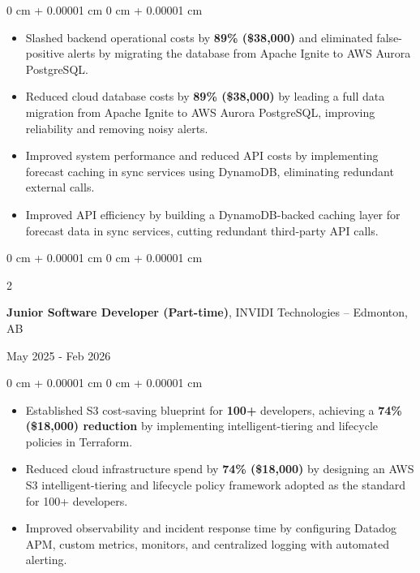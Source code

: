 \documentclass[10pt, letterpaper]{article}
\newenvironment{onecolentry}{
    \begin{adjustwidth}{
        0 cm + 0.00001 cm
    }{
        0 cm + 0.00001 cm
    }
}{
    \end{adjustwidth}
}
\newenvironment{twocolentry}[2][]{
    \onecolentry
    \def\secondColumn{#2}
    \setcolumnwidth{\fill, 6 cm}
    \begin{paracol}{2}
}{
    \switchcolumn \raggedleft \secondColumn
    \end{paracol}
    \endonecolentry
}
\begin{document}
    \vspace{0.10 cm}
    \begin{onecolentry}
        \begin{itemize}[leftmargin=2em, itemsep=1pt, parsep=0pt, topsep=0pt, partopsep=0pt]
            \item Slashed backend operational costs by \textbf{89\% (\$38,000)} and eliminated false-positive alerts by migrating the database from Apache Ignite to AWS Aurora PostgreSQL.
            \item Reduced cloud database costs by \textbf{89\% (\$38,000)} by leading a full data migration from Apache Ignite to AWS Aurora PostgreSQL, improving reliability and removing noisy alerts.
            \item Improved system performance and reduced API costs by implementing forecast caching in sync services using DynamoDB, eliminating redundant external calls.
            \item Improved API efficiency by building a DynamoDB-backed caching layer for forecast data in sync services, cutting redundant third-party API calls.
        \end{itemize}
    \end{onecolentry}

    \vspace{0.10 cm}

    \begin{twocolentry}{May 2025 - Feb 2026}
        \textbf{Junior Software Developer (Part-time)}, INVIDI Technologies -- Edmonton, AB
    \end{twocolentry}

    \vspace{0.10 cm}
    \begin{onecolentry}
        \begin{itemize}[leftmargin=2em, itemsep=1pt, parsep=0pt, topsep=0pt, partopsep=0pt]
            \item Established S3 cost-saving blueprint for \textbf{100+} developers, achieving a \textbf{74\% (\$18,000) reduction} by implementing intelligent-tiering and lifecycle policies in Terraform.
            \item Reduced cloud infrastructure spend by \textbf{74\% (\$18,000)} by designing an AWS S3 intelligent-tiering and lifecycle policy framework adopted as the standard for 100+ developers.
            \item Improved observability and incident response time by configuring Datadog APM, custom metrics, monitors, and centralized logging with automated alerting.
        \end{itemize}
    \end{onecolentry}
\end{document}
